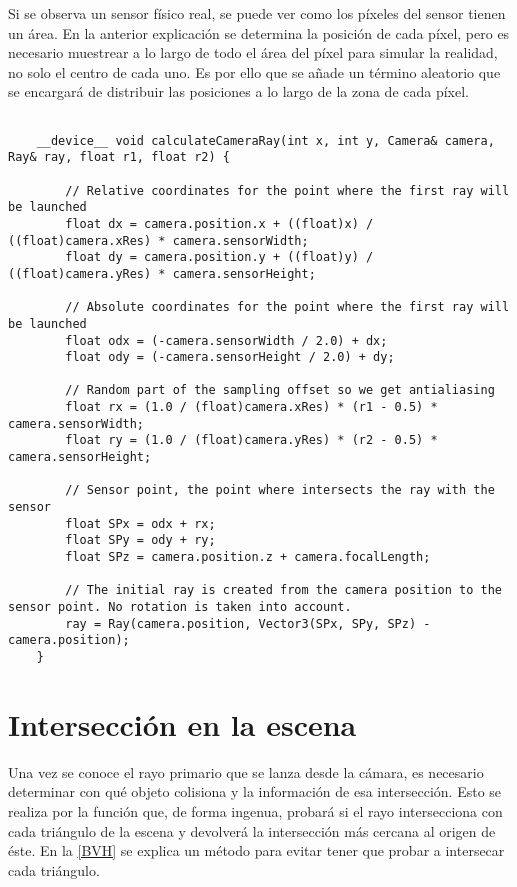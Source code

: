 Si se observa un sensor físico real, se puede ver como los píxeles del sensor tienen un área. En la anterior explicación se determina la posición de cada píxel, pero es necesario muestrear a lo largo de todo el área del píxel para simular la realidad, no solo el centro de cada uno. Es por ello que se añade un término aleatorio  que se encargará de distribuir las posiciones a lo largo de la zona de cada píxel.

\begin{lstlisting}
	
	__device__ void calculateCameraRay(int x, int y, Camera& camera, Ray& ray, float r1, float r2) {

		// Relative coordinates for the point where the first ray will be launched
		float dx = camera.position.x + ((float)x) / ((float)camera.xRes) * camera.sensorWidth;
		float dy = camera.position.y + ((float)y) / ((float)camera.yRes) * camera.sensorHeight;

		// Absolute coordinates for the point where the first ray will be launched
		float odx = (-camera.sensorWidth / 2.0) + dx;
		float ody = (-camera.sensorHeight / 2.0) + dy;

		// Random part of the sampling offset so we get antialiasing
		float rx = (1.0 / (float)camera.xRes) * (r1 - 0.5) * camera.sensorWidth;
		float ry = (1.0 / (float)camera.yRes) * (r2 - 0.5) * camera.sensorHeight;

		// Sensor point, the point where intersects the ray with the sensor
		float SPx = odx + rx;
		float SPy = ody + ry;
		float SPz = camera.position.z + camera.focalLength;

		// The initial ray is created from the camera position to the sensor point. No rotation is taken into account.
		ray = Ray(camera.position, Vector3(SPx, SPy, SPz) - camera.position);
	}

\end{lstlisting}

\section{Intersección en la escena}
\label{sec:throwray}

Una vez se conoce el rayo primario que se lanza desde la cámara, es necesario determinar con qué objeto colisiona y la información de esa intersección. Esto se realiza por la función  que, de forma ingenua, probará si el rayo intersecciona con cada triángulo de la escena y devolverá la intersección más cercana al origen de éste. En la \autoref{BVH} se explica un método para evitar tener que probar a intersecar cada triángulo.

